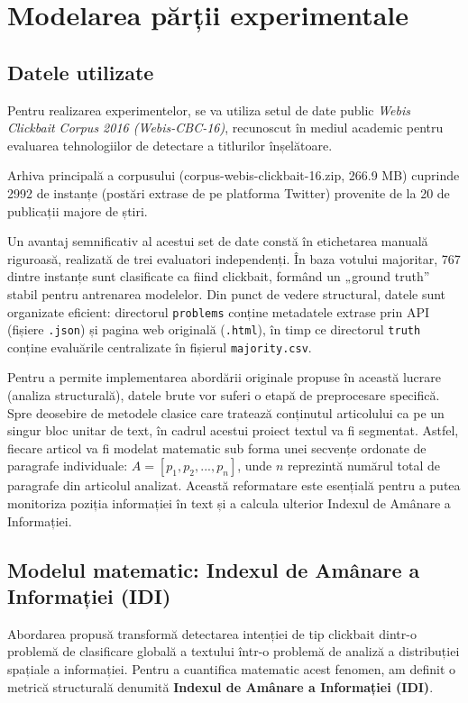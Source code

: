 \documentclass[12pt, a4paper]{article}
\begin{document}
\section{Modelarea părții experimentale}
\subsection{Datele utilizate}

Pentru realizarea experimentelor, se va utiliza setul de date public \textit{Webis Clickbait Corpus 2016 (Webis-CBC-16)}, recunoscut în mediul academic pentru evaluarea tehnologiilor de detectare a titlurilor înșelătoare. 

Arhiva principală a corpusului (corpus-webis-clickbait-16.zip, 266.9 MB) cuprinde 2992 de instanțe (postări extrase de pe platforma Twitter) provenite de la 20 de publicații majore de știri. 

Un avantaj semnificativ al acestui set de date constă în etichetarea manuală riguroasă, realizată de trei evaluatori independenți. În baza votului majoritar, 767 dintre instanțe sunt clasificate ca fiind clickbait, formând un „ground truth” stabil pentru antrenarea modelelor. Din punct de vedere structural, datele sunt organizate eficient: directorul \texttt{problems} conține metadatele extrase prin API (fișiere \texttt{.json}) și pagina web originală (\texttt{.html}), în timp ce directorul \texttt{truth} conține evaluările centralizate în fișierul \texttt{majority.csv}.

Pentru a permite implementarea abordării originale propuse în această lucrare (analiza structurală), datele brute vor suferi o etapă de preprocesare specifică. Spre deosebire de metodele clasice care tratează conținutul articolului ca pe un singur bloc unitar de text, în cadrul acestui proiect textul va fi segmentat. Astfel, fiecare articol va fi modelat matematic sub forma unei secvențe ordonate de paragrafe individuale: $A = [p_1, p_2, ..., p_n]$, unde $n$ reprezintă numărul total de paragrafe din articolul analizat. Această reformatare este esențială pentru a putea monitoriza poziția informației în text și a calcula ulterior Indexul de Amânare a Informației.

\subsection{Modelul matematic: Indexul de Amânare a Informației (IDI)}

Abordarea propusă transformă detectarea intenției de tip clickbait dintr-o problemă de clasificare globală a textului într-o problemă de analiză a distribuției spațiale a informației. Pentru a cuantifica matematic acest fenomen, am definit o metrică structurală denumită \textbf{Indexul de Amânare a Informației (IDI)}.
\end{document}
